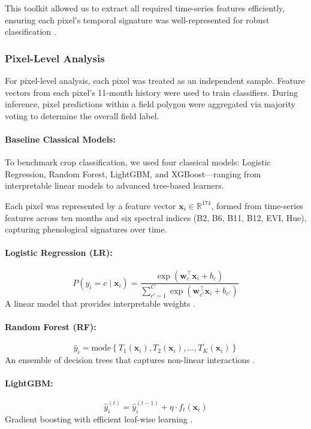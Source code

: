 \documentclass[pdflatex,sn-mathphys]{sn-jnl} %
\begin{document}
This toolkit allowed us to extract all required time-series features efficiently, ensuring each pixel’s temporal signature was well-represented for robust classification \cite{mann2025}.

\subsubsection{Pixel-Level Analysis}

For pixel-level analysis, each pixel was treated as an independent sample. Feature vectors from each pixel’s 11-month history were used to train classifiers. During inference, pixel predictions within a field polygon were aggregated via majority voting to determine the overall field label.

\paragraph{Baseline Classical Models:}

To benchmark crop classification, we used four classical models: Logistic Regression, Random Forest, LightGBM, and XGBoost—ranging from interpretable linear models to advanced tree-based learners.

Each pixel was represented by a feature vector $\mathbf{x}_i \in \mathbb{R}^{174}$, formed from time-series features across ten months and six spectral indices (B2, B6, B11, B12, EVI, Hue), capturing phenological signatures over time.

\paragraph{Logistic Regression (LR):}
    \[
    P(y_i = c \mid \mathbf{x}_i) =
    \frac{\exp(\mathbf{w}_c^\top \mathbf{x}_i + b_c)}
    {\sum_{c'=1}^{C} \exp(\mathbf{w}_{c'}^\top \mathbf{x}_i + b_{c'})}
    \]
  A linear model that provides interpretable weights \cite{james2013}.

\paragraph{Random Forest (RF):} 
  \[
  \hat{y}_i = \text{mode}\left\{ T_1(\mathbf{x}_i), T_2(\mathbf{x}_i), \dots, T_K(\mathbf{x}_i) \right\}
  \]
  An ensemble of decision trees that captures non-linear interactions \cite{breiman2001}.
  
\paragraph{LightGBM:}
  \[
  \hat{y}_i^{(t)} = \hat{y}_i^{(t-1)} + \eta \cdot f_t(\mathbf{x}_i)
  \]
  Gradient boosting with efficient leaf-wise learning \cite{ke2017}.
\end{document}
